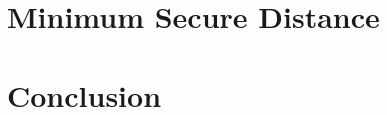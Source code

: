 \documentclass{ieeetran}
\begin{document}
\section{Minimum Secure Distance}


\section{Conclusion}
\end{document}
